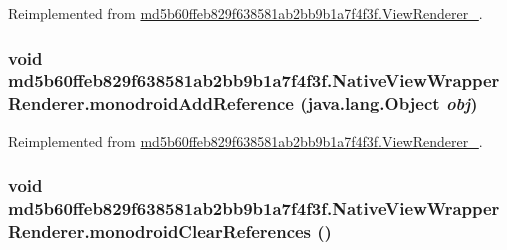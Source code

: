Reimplemented from \hyperlink{classmd5b60ffeb829f638581ab2bb9b1a7f4f3f_1_1_view_renderer__2_a0898cf56fa9a49b653470eaf1608e77}{md5b60ffeb829f638581ab2bb9b1a7f4f3f.ViewRenderer\_}.\hypertarget{classmd5b60ffeb829f638581ab2bb9b1a7f4f3f_1_1_native_view_wrapper_renderer_c0772b6e92a3ac384e0afcad6f2b8f3a}{
\subsubsection[{monodroidAddReference}]{\setlength{\rightskip}{0pt plus 5cm}void md5b60ffeb829f638581ab2bb9b1a7f4f3f.NativeViewWrapperRenderer.monodroidAddReference (java.lang.Object {\em obj})}}
\label{classmd5b60ffeb829f638581ab2bb9b1a7f4f3f_1_1_native_view_wrapper_renderer_c0772b6e92a3ac384e0afcad6f2b8f3a}




Reimplemented from \hyperlink{classmd5b60ffeb829f638581ab2bb9b1a7f4f3f_1_1_view_renderer__2_64ca8244a89f60a47c173d9c0b15d610}{md5b60ffeb829f638581ab2bb9b1a7f4f3f.ViewRenderer\_}.\hypertarget{classmd5b60ffeb829f638581ab2bb9b1a7f4f3f_1_1_native_view_wrapper_renderer_114bc48169194b48313389e210786635}{
\subsubsection[{monodroidClearReferences}]{\setlength{\rightskip}{0pt plus 5cm}void md5b60ffeb829f638581ab2bb9b1a7f4f3f.NativeViewWrapperRenderer.monodroidClearReferences ()}}
\label{classmd5b60ffeb829f638581ab2bb9b1a7f4f3f_1_1_native_view_wrapper_renderer_114bc48169194b48313389e210786635}




